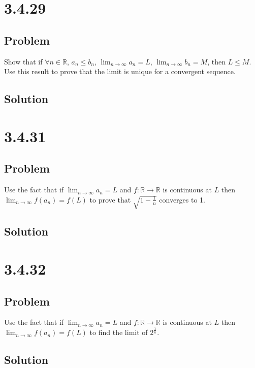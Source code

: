 \documentclass[12pt]{article}
\newcommand{\R}    [0]{\mathbb{R}                   }
\begin{document}
\section*{3.4.29}

\subsection*{Problem}
Show that if $\forall n \in \R$, $a_n \leq b_n$, $\lim_{n \to \infty} a_n = L$, $\lim_{n \to \infty} b_n = M$, then $L \leq M$. Use this result to prove that the limit is unique for a convergent sequence.

\subsection*{Solution}



\section*{3.4.31}

\subsection*{Problem}
Use the fact that if $\lim_{n \to \infty} a_n = L$ and $f : \R \to \R$ is continuous at $L$ then $\lim_{n \to \infty} f(a_n) = f(L)$ to prove that $\sqrt{1 - \frac{1}{n}}$ converges to 1.

\subsection*{Solution}



\section*{3.4.32}

\subsection*{Problem}
Use the fact that if $\lim_{n \to \infty} a_n = L$ and $f : \R \to \R$ is continuous at $L$ then $\lim_{n \to \infty} f(a_n) = f(L)$ to find the limit of $2^\frac{1}{n}$.

\subsection*{Solution}
\end{document}
